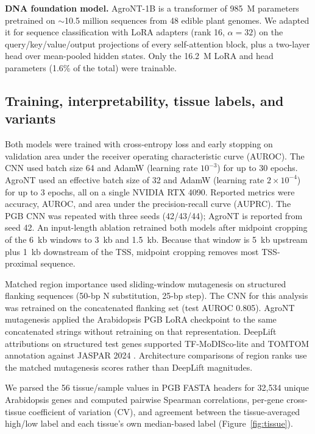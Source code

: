 \documentclass[11pt]{article}
\begin{document}
\textbf{DNA foundation model.} AgroNT-1B \citep{mendoza2024} is a transformer of 985~M parameters pretrained on $\sim$10.5 million sequences from 48 edible plant genomes. We adapted it for sequence classification with LoRA adapters \citep{hu2021lora} (rank 16, $\alpha=32$) on the query/key/value/output projections of every self-attention block, plus a two-layer head over mean-pooled hidden states. Only the 16.2~M LoRA and head parameters (1.6\% of the total) were trainable.

\subsection{Training, interpretability, tissue labels, and variants}

Both models were trained with cross-entropy loss and early stopping on validation area under the receiver operating characteristic curve (AUROC). The CNN used batch size 64 and AdamW (learning rate $10^{-3}$) for up to 30 epochs. AgroNT used an effective batch size of 32 and AdamW (learning rate $2\times10^{-4}$) for up to 3 epochs, all on a single NVIDIA RTX 4090. Reported metrics were accuracy, AUROC, and area under the precision-recall curve (AUPRC). The PGB CNN was repeated with three seeds (42/43/44); AgroNT is reported from seed 42. An input-length ablation retrained both models after midpoint cropping of the 6~kb windows to 3~kb and 1.5~kb. Because that window is 5~kb upstream plus 1~kb downstream of the TSS, midpoint cropping removes most TSS-proximal sequence.

Matched region importance used sliding-window mutagenesis on structured flanking sequences (50-bp N substitution, 25-bp step). The CNN for this analysis was retrained on the concatenated flanking set (test AUROC 0.805). AgroNT mutagenesis applied the Arabidopsis PGB LoRA checkpoint to the same concatenated strings without retraining on that representation. DeepLift attributions \citep{shrikumar2017} on structured test genes supported TF-MoDISco-lite \citep{shrikumar2018} and TOMTOM annotation against JASPAR 2024 \citep{rauluseviciute2024}. Architecture comparisons of region ranks use the matched mutagenesis scores rather than DeepLift magnitudes.

We parsed the 56 tissue/sample values in PGB FASTA headers for 32,534 unique Arabidopsis genes and computed pairwise Spearman correlations, per-gene cross-tissue coefficient of variation (CV), and agreement between the tissue-averaged high/low label and each tissue's own median-based label (Figure~\ref{fig:tissue}).
\end{document}
